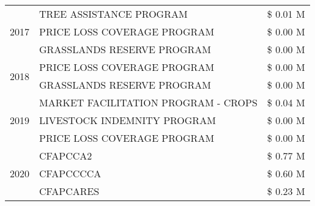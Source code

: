 \begin{tabular}{llr}
\multirow[t]{3}{*}{2017} & TREE ASSISTANCE PROGRAM & \$ 0.01 M \\
 & PRICE LOSS COVERAGE PROGRAM & \$ 0.00 M \\
 & GRASSLANDS RESERVE PROGRAM & \$ 0.00 M \\
\cline{1-3}
\multirow[t]{2}{*}{2018} & PRICE LOSS COVERAGE PROGRAM & \$ 0.00 M \\
 & GRASSLANDS RESERVE PROGRAM & \$ 0.00 M \\
\cline{1-3}
\multirow[t]{3}{*}{2019} & MARKET FACILITATION PROGRAM - CROPS & \$ 0.04 M \\
 & LIVESTOCK INDEMNITY PROGRAM & \$ 0.00 M \\
 & PRICE LOSS COVERAGE PROGRAM & \$ 0.00 M \\
\cline{1-3}
\multirow[t]{3}{*}{2020} & CFAPCCA2 & \$ 0.77 M \\
 & CFAPCCCCA & \$ 0.60 M \\
 & CFAPCARES & \$ 0.23 M \\
\cline{1-3}
\bottomrule
\end{tabular}
